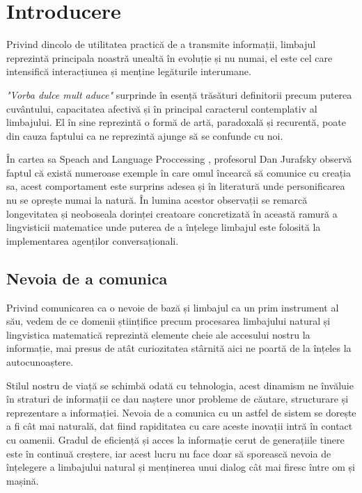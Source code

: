 \chapter{Introducere}


Privind dincolo de utilitatea practică de a transmite informații, limbajul reprezintă principala noastră unealtă în evoluție și nu numai, el este cel care intensifică interacțiunea și menține legăturile interumane.

\textit{"Vorba dulce mult aduce"} surprinde în esență trăsături definitorii precum puterea cuvântului, capacitatea afectivă și în principal caracterul contemplativ al limbajului. El în sine reprezintă o formă de artă, paradoxală și recurentă, poate din cauza faptului ca ne reprezintă ajunge să se confunde cu noi.

În cartea sa Speach and Language Proccessing \cite{speach__lang_processing}, profesorul Dan Jurafsky observă faptul că există numeroase exemple în care omul încearcă să comunice cu creația sa, acest comportament este surprins adesea și în literatură unde personificarea nu se oprește numai la natură. În lumina acestor observații se remarcă longevitatea și neoboseala dorinței creatoare concretizată în această ramură a lingvisticii matematice unde puterea de a înțelege limbajul este folosită la implementarea agenților conversaționali.


\section{Nevoia de a comunica}

Privind comunicarea ca o nevoie de bază și limbajul ca un prim instrument al său, vedem de ce domenii științifice precum procesarea limbajului natural și lingvistica matematică reprezintă elemente cheie ale accesului nostru la informație, mai presus de atât curiozitatea stârnită aici ne poartă de la înțeles la autocunoaștere.

Stilul nostru de viață se schimbă odată cu tehnologia, acest dinamism ne învăluie în straturi de informații ce dau naștere unor probleme de căutare, structurare și reprezentare a informației. Nevoia de a comunica cu un astfel de sistem se dorește a fi cât mai naturală, dat fiind rapiditatea cu care aceste inovații intră în contact cu oamenii. Gradul de eficiență și acces la informație cerut de generațiile tinere este în continuă creștere, iar acest lucru nu face doar să sporească nevoia de înțelegere a limbajului natural și menținerea unui dialog cât mai firesc între om și mașină.


